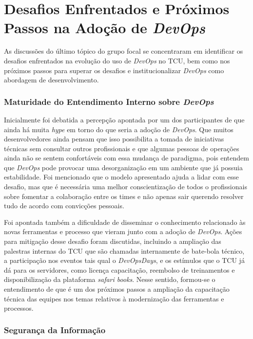 \section{Desafios Enfrentados e Próximos Passos na Adoção de \emph{DevOps}}

As discussões do último tópico do grupo focal se concentraram em identificar
os desafios enfrentados na evolução do uso de {\it DevOps} no \acrshort{TCU},
bem como nos próximos passos para superar os desafios e institucionalizar
{\it DevOps} como abordagem de desenvolvimento.

\subsubsection{Maturidade do Entendimento Interno sobre \emph{DevOps}}
Inicialmente foi debatida a percepção apontada por um dos participantes de que
ainda há muita {\it hype} em torno do que seria a adoção de {\it DevOps}. Que
muitos desenvolvedores ainda pensam que isso possibilita a tomada de
iniciativas técnicas sem consultar outros profissionais e que algumas pessoas de
operações ainda não se sentem confortáveis com essa mudança de paradigma, pois
entendem que {\it DevOps} pode provocar uma desorganização em um ambiente que já
possuia estabilidade. Foi mencionado que o modelo apresentado
ajuda a lidar com esse desafio, mas que é necessária uma melhor conscientização
de todos o profissionais sobre fomentar a colaboração entre os times e não
apenas sair querendo resolver tudo de acordo com convicções pessoais.

Foi apontada também a dificuldade de disseminar o conhecimento relacionado
às novas ferramentas e processo que vieram junto com a adoção de {\it DevOps}.
Ações para mitigação desse desafio foram discutidas, incluindo a ampliação das
palestras internas do \acrshort{TCU} que são chamadas internamente de bate-bola
técnico, a participação nos eventos tais qual o \emph{DevOpsDays}, e os estímulos
que o \acrshort{TCU} já dá para os servidores, como licença capacitação,
reembolso de treinamentos e disponibilização da plataforma {\it safari books}.
Nesse sentido, formou-se o entendimento de que é um dos próximos passos a
ampliação da capacitação técnica das equipes nos temas relativos à modernização
das ferramentas e processos.

\subsubsection{Segurança da Informação}

